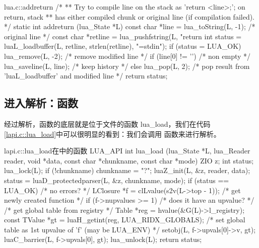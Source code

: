 \begin{ccode}{lua.c::addreturn}
/*
** Try to compile line on the stack as 'return <line>;'; on return, stack
** has either compiled chunk or original line (if compilation failed).
*/
static int addreturn (lua_State *L) {
  const char *line = lua_toString(L, -1); /* original line */
  const char *retline = lua_pushfstring(L, "return %
  int status = luaL_loadbuffer(L, retline, strlen(retline), "=stdin");
  if (status = LUA_OK) {
    lua_remove(L, -2); /* remove modified line */
    if (line[0] != '\0') /* non empty */
      lua_saveline(L, line);  /* keep history */
  }
  else
    lua_pop(L, 2);  /* pop result from 'luaL_loadbuffer' and modified line */
  return status;
}
\end{ccode}


\subsection{进入解析：函数}

经过解析，函数的底层就是位于文件的函数\cmd
{lua\_load}，我们在代码\ref{lapi.c::lua_load}中可以很明显的看到：我们会调用
函数来进行解析。

\begin{ccode}{lapi.c::lua_load}{在中的函数}
LUA_API int lua_load (lua_State *L, lua_Reader reader, void *data,
                      const char *chunkname, const char *mode) {
  ZIO z;
  int status;
  lua_lock(L);
  if (!chunkname) chunkname = "?";
  luaZ_init(L, &z, reader, data);
  status = luaD_protectedparser(L, &z, chunkname, mode);
  if (status == LUA_OK) {  /* no errors? */
    LClosure *f = clLvalue(s2v(L->top - 1));  /* get newly created function */
    if (f->nupvalues >= 1) {  /* does it have an upvalue? */
      /* get global table from registry */
      Table *reg = hvalue(&G(L)->l_registry);
      const TValue *gt = luaH_getint(reg, LUA_RIDX_GLOBALS);
      /* set global table as 1st upvalue of 'f' (may be LUA_ENV) */
      setobj(L, f->upvals[0]->v, gt);
      luaC_barrier(L, f->upvals[0], gt);
    }
  }
  lua_unlock(L);
  return status;
}
\end{ccode}


